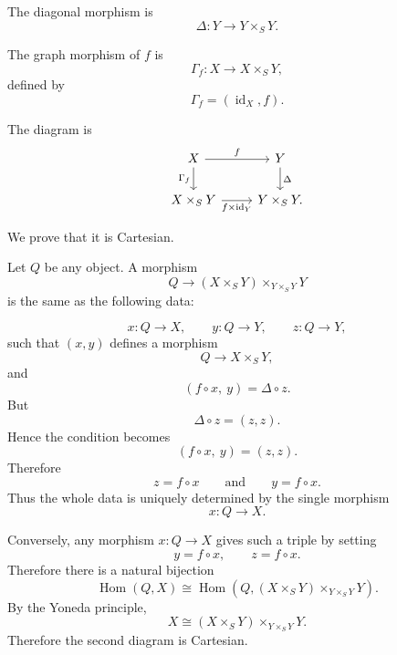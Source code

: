 \documentclass[12pt,a4paper]{article}
\theoremstyle{notespace}
\begin{document}
The diagonal morphism is
\[
\Delta:Y\longrightarrow Y\times_S Y.
\]

The graph morphism of \(f\) is
\[
\Gamma_f:X\longrightarrow X\times_S Y,
\]
defined by
\[
\Gamma_f=(\operatorname{id}_X,f).
\]

The diagram is
\[
\begin{tikzcd}
	X \arrow[r,"f"] \arrow[d,"\Gamma_f"']
	&
	Y \arrow[d,"\Delta"]
	\\
	X\times_S Y \arrow[r,"f\times \operatorname{id}_Y"']
	&
	Y\times_S Y.
\end{tikzcd}
\]

We prove that it is Cartesian.

Let \(Q\) be any object. A morphism
\[
Q\longrightarrow
(X\times_S Y)\times_{Y\times_S Y}Y
\]
is the same as the following data:

\[
x:Q\to X,
\qquad
y:Q\to Y,
\qquad
z:Q\to Y,
\]
such that \((x,y)\) defines a morphism
\[
Q\to X\times_S Y,
\]
and
\[
(f\circ x,\ y)=\Delta\circ z.
\]
But
\[
\Delta\circ z=(z,z).
\]
Hence the condition becomes
\[
(f\circ x,\ y)=(z,z).
\]
Therefore
\[
z=f\circ x
\qquad\text{and}\qquad
y=f\circ x.
\]
Thus the whole data is uniquely determined by the single morphism
\[
x:Q\to X.
\]

Conversely, any morphism \(x:Q\to X\) gives such a triple by setting
\[
y=f\circ x,
\qquad
z=f\circ x.
\]
Therefore there is a natural bijection
\[
\operatorname{Hom}(Q,X)
\cong
\operatorname{Hom}
\left(
Q,(X\times_S Y)\times_{Y\times_S Y}Y
\right).
\]
By the Yoneda principle,
\[
X
\cong
(X\times_S Y)\times_{Y\times_S Y}Y.
\]
Therefore the second diagram is Cartesian.
\end{document}
